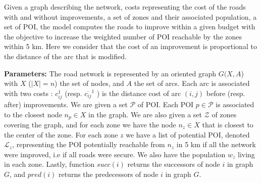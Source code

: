 Given a graph describing the network, costs representing the cost of the roads with and without improvements, a set of zones and their associated population, a set of POI, the model computes the roads to improve within a given budget with the objective to increase the weighted number of POI reachable by the zones within 5 km. Here we consider that the cost of an improvement is proportional to the distance of the arc that is modified. 


\textbf{Parameters:} The road network is represented by an oriented graph $G(X,A$) with $X$ ($|X|=n$) the set of nodes, and $A$ the set of arcs. Each arc is associated with two costs : $c_{ij}^1$ (resp. $\overline{c_{ij}}^1$ ) is the distance cost of arc $(i,j)$ before (resp. after) improvements. We are given a set $\mathcal{P}$ of POI. Each POI $p \in \mathcal{P}$ is associated to the closest node $n_p \in X$ in the graph. We are also given a set $\mathcal{Z}$ of zones covering the graph, and for each zone we have the node $n_z \in X$ that is closest to the center of the zone. For each zone $z$ we have a list of potential POI, denoted $\mathcal{L}_z$, representing the POI potentially reachable from $n_z$ in 5 km if all the network were improved, i.e if all roads were secure. We also have the population $w_z$ living in each zone. Lastly, function $succ(i)$ returns the successors of node $i$ in graph $G$, and $pred(i)$ returns the predecessors of node $i$ in graph $G$.
 \\


